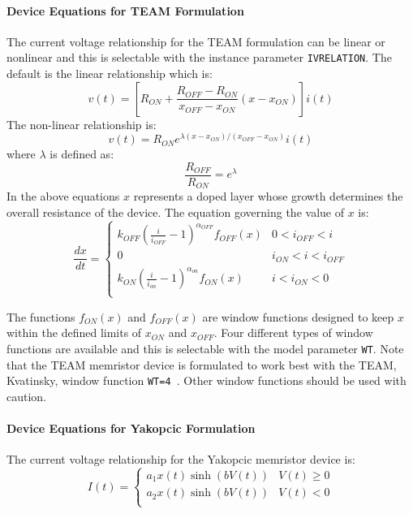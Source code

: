 \paragraph{Device Equations for TEAM Formulation}
The current voltage relationship for the TEAM formulation can be linear or nonlinear and this is selectable with 
the instance parameter {\tt IVRELATION}.  The default is the linear relationship which is:
\begin{equation}
v(t) = \left[ R_{ON} + \frac{R_{OFF} - R_{ON}}{x_{OFF} - x_{ON}} \left( x - x_{ON} \right) \right] i(t)
\end{equation}
The non-linear relationship is:
\begin{equation}
v(t) = R_{ON} e^{\lambda(x - x_{ON})/(x_{OFF}-x_{ON})}  i(t)
\end{equation}
where $\lambda$ is defined as:
\begin{equation}
\frac{R_{OFF}}{R_{ON}} = e^{\lambda}
\end{equation}
In the above equations $x$ represents a doped layer whose growth determines the overall
resistance of the device.  The equation governing the value of $x$ is:
\begin{equation}
\frac{dx}{dt} = \left\{  
  \begin{array}{ll}
    k_{OFF} \left(\frac{i}{i_{OFF}} - 1 \right)^{\alpha_{OFF}} f_{OFF}(x) & 0 < i_{OFF} < i \\
    0       & i_{ON} < i < i_{OFF} \\
    k_{ON} \left(\frac{i}{i_{on}} - 1 \right)^{\alpha_{on}} f_{ON}(x) & i < i_{ON} < 0 \\
  \end{array}
  \right.
\end{equation}

The functions $f_{ON}(x)$ and $f_{OFF}(x)$ are window functions designed to keep $x$ within
the defined limits of $x_{ON}$ and $x_{OFF}$.  Four different types of window functions 
are available and this is selectable with the model parameter {\tt WT}. Note that the 
TEAM memristor device is formulated to work best with the TEAM, Kvatinsky, window 
function {\tt WT=4 }.  Other window functions should be used with caution.

\paragraph{Device Equations for Yakopcic Formulation}
The current voltage relationship for the Yakopcic memristor device is:~\cite{ChrisYakopcic2013}
\begin{equation}
I(t) = \left\{  
  \begin{array}{ll}
    a_1 x(t) \sinh(b V(t)) & V(t) \ge 0 \\
    a_2 x(t) \sinh(b V(t)) & V(t) < 0 \\
  \end{array}
  \right.
\end{equation}

